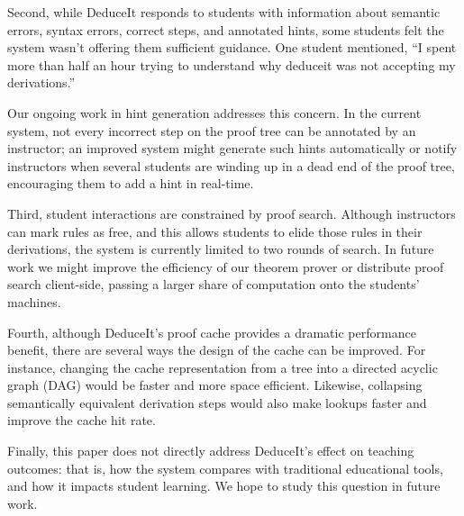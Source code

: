 \documentclass{sigchi}
\begin{document}
Second, while DeduceIt responds to students with information about semantic errors, syntax errors, correct steps, and annotated hints, some students felt the system wasn't offering them sufficient guidance. One student mentioned, ``I spent more than half an hour trying to understand why deduceit was not accepting my derivations.''

Our ongoing work in hint generation addresses this concern. In the current system, not every incorrect step on the proof tree can be annotated by an instructor; an improved system might generate such hints automatically or notify instructors when several students are winding up in a dead end of the proof tree, encouraging them to add a hint in real-time.

Third, student interactions are constrained by proof search. Although instructors can mark rules as free, and this allows students to elide those rules in their derivations, the system is currently limited to two rounds of search. In future work we might improve the efficiency of our theorem prover or distribute proof search client-side, passing a larger share of computation onto the students' machines.

Fourth, although DeduceIt's proof cache provides a dramatic performance benefit, there are several ways the design of the cache can be improved. For instance, changing the cache representation from a tree into a directed acyclic graph (DAG) would be faster and more space efficient. Likewise, collapsing semantically equivalent derivation steps would also make lookups faster and improve the cache hit rate.

Finally, this paper does not directly address DeduceIt's effect on teaching outcomes: that is, how the system compares with traditional educational tools, and how it impacts student learning. We hope to study this question in future work.





\end{document}
